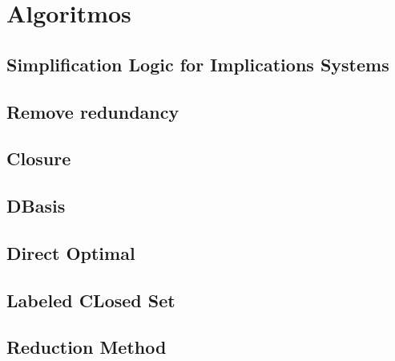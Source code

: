\section{Algoritmos}

\subsection{Simplification Logic for Implications Systems}

\subsection{Remove redundancy}

 

\subsection{Closure}

\subsection{DBasis}

\subsection{Direct Optimal}

\subsection{Labeled CLosed Set}

\subsection{Reduction Method}

\newpage
\thispagestyle{empty}
\mbox{}

\newpage